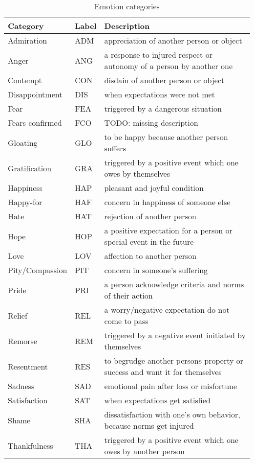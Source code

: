 \begin{table}
  \centering
  \begin{tabular}{llp{8cm}}
    Category & Label & Description \\
    \hline
    Admiration & ADM & appreciation of another person or object \\
    Anger & ANG & a response to injured respect or autonomy of a person by another one \\
    Contempt & CON & disdain of another person or object \\
    Disappointment & DIS & when expectations were not met \\
    Fear & FEA & triggered by a dangerous situation \\
    Fears confirmed & FCO & TODO: missing description \\
    Gloating & GLO & to be happy because another person suffers \\
    Gratification & GRA & triggered by a positive event which one owes by themselves  \\
    Happiness & HAP & pleasant and joyful condition \\
    Happy-for & HAF & concern in happiness of someone else \\
    Hate & HAT & rejection of another person \\
    Hope & HOP & a positive expectation for a person or special event in the future \\
    Love & LOV & affection to another person \\
    Pity/Compassion & PIT & concern in someone's suffering \\
    Pride & PRI & a person acknowledge criteria and norms of their action \\
    Relief & REL & a worry/negative expectation do not come to pass \\
    Remorse & REM & triggered by a negative event initiated by themselves \\
    Resentment & RES & to begrudge another persons property or success and want it for themselves \\
    Sadness & SAD & emotional pain after loss or misfortune \\
    Satisfaction & SAT & when expectations get satisfied \\
    Shame & SHA & dissatisfaction with one's own behavior, because norms get injured \\
    Thankfulness & THA & triggered by a positive event which one owes by another person \\
  \end{tabular}
  \caption{Emotion categories}
  \label{tab:emotion_categories}
\end{table}



